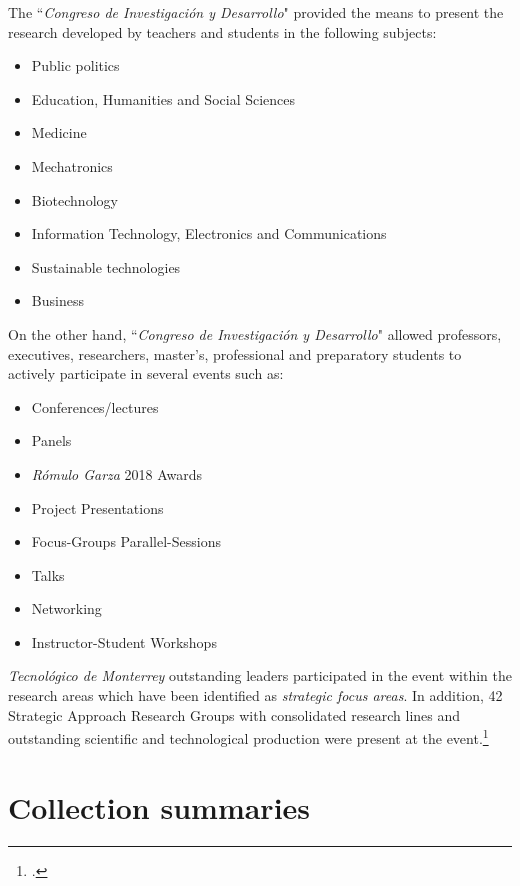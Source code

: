 \documentclass[11pt,a4paper]{article}
\begin{document}
The ``\emph{Congreso de Investigación y Desarrollo}" provided the means to present the research developed by teachers and students in the following subjects:

\begin{itemize}
	\item{Public politics}
	\item{Education, Humanities and Social Sciences}
	\item{Medicine}
	\item{Mechatronics}
	\item{Biotechnology}
	\item{Information Technology, Electronics and Communications}
	\item{Sustainable technologies}
	\item{Business}
\end{itemize}

On the other hand, ``\emph{Congreso de Investigación y Desarrollo}" allowed professors, executives, researchers, master's, professional and preparatory students to actively participate in several events such as:

\begin{itemize}
	\item{Conferences/lectures}
	\item{Panels}
	\item{\emph{Rómulo Garza} 2018 Awards}
	\item{Project Presentations}
	\item{Focus-Groups Parallel-Sessions}
	\item{Talks}
	\item{Networking}
	\item{Instructor-Student Workshops}
\end{itemize}

\emph{Tecnológico de Monterrey} outstanding leaders participated in the event within the research areas which have been identified as \emph{strategic focus areas}. In addition, 42 Strategic Approach Research Groups with consolidated research lines and outstanding scientific and technological production were present at the event.\footcite{49CID2019}

\clearpage

\section{Collection summaries}\label{sec:summaries}
\end{document}
